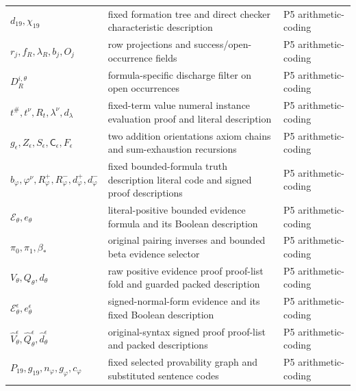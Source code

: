 \begin{longtable}{@{}p{}p{}p{}@{}}
\(d_{19},\allowbreak \chi_{19}\) & fixed formation tree and direct checker characteristic description & P5 arithmetic-\allowbreak{}coding \\
\(r_j,\allowbreak f_R,\allowbreak \lambda_R,\allowbreak b_j,\allowbreak O_j\) & row projections and success/open-occurrence fields & P5 arithmetic-\allowbreak{}coding \\
\(D_R^{i,\theta}\) & formula-specific discharge filter on open occurrences & P5 arithmetic-\allowbreak{}coding \\
\(t^\#,\allowbreak t^\nu,\allowbreak R_t,\allowbreak \lambda^\nu,\allowbreak d_\lambda\) & fixed-term value numeral instance evaluation proof and literal description & P5 arithmetic-\allowbreak{}coding \\
\(g_\epsilon,\allowbreak Z_\epsilon,\allowbreak S_\epsilon,\allowbreak \mathsf C_\epsilon,\allowbreak F_\epsilon\) & two addition orientations axiom chains and sum-exhaustion recursions & P5 arithmetic-\allowbreak{}coding \\
\(b_\varphi,\allowbreak \varphi^\nu,\allowbreak R_\varphi^+,\allowbreak R_\varphi^-,\allowbreak d_\varphi^+,\allowbreak d_\varphi^-\) & fixed bounded-formula truth description literal code and signed proof descriptions & P5 arithmetic-\allowbreak{}coding \\
\(\mathcal E_\theta,\allowbreak e_\theta\) & literal-positive bounded evidence formula and its Boolean description & P5 arithmetic-\allowbreak{}coding \\
\(\pi_0,\allowbreak \pi_1,\allowbreak \beta_*\) & original pairing inverses and bounded beta evidence selector & P5 arithmetic-\allowbreak{}coding \\
\(V_\theta,\allowbreak Q_\theta,\allowbreak d_\theta\) & raw positive evidence proof proof-list fold and guarded packed description & P5 arithmetic-\allowbreak{}coding \\
\(\mathcal E_\theta^\epsilon,\allowbreak e_\theta^\epsilon\) & signed-normal-form evidence and its fixed Boolean description & P5 arithmetic-\allowbreak{}coding \\
\(\widehat V_\theta^\epsilon,\allowbreak \widehat Q_\theta^\epsilon,\allowbreak \widehat d_\theta^\epsilon\) & original-syntax signed proof proof-list and packed descriptions & P5 arithmetic-\allowbreak{}coding \\
\(P_{19},\allowbreak g_{19},\allowbreak n_\varphi,\allowbreak g_\varphi,\allowbreak c_\varphi\) & fixed selected provability graph and substituted sentence codes & P5 arithmetic-\allowbreak{}coding \\

\end{longtable}
